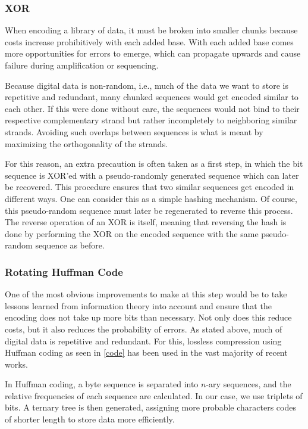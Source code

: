\documentclass[a4paper,conference]{IEEEtran}
\begin{document}
\subsubsection{XOR}
When encoding a library of data, it must be broken into smaller chunks because costs increase prohibitively with each added base. With each added base comes more opportunities for errors to emerge, which can propagate upwards and cause failure during amplification or sequencing.

Because digital data is non-random, i.e., much of the data we want to store is repetitive and redundant, many chunked sequences would get encoded similar to each other. If this were done without care, the sequences would not bind to their respective complementary strand but rather incompletely to neighboring similar strands. Avoiding such overlaps between sequences is what is meant by maximizing the orthogonality of the strands.

For this reason, an extra precaution is often taken as a first step, in which the bit sequence is XOR'ed with a pseudo-randomly generated sequence which can later be recovered. This procedure ensures that two similar sequences get encoded in different ways. One can consider this as a simple hashing mechanism. Of course, this pseudo-random sequence must later be regenerated to reverse this process. The reverse operation of an XOR is itself, meaning that reversing the hash is done by performing the XOR on the encoded sequence with the same pseudo-random sequence as before.

\subsubsection{Rotating Huffman Code}
One of the most obvious improvements to make at this step would be to take lessons learned from information theory into account and ensure that the encoding does not take up more bits than necessary. Not only does this reduce costs, but it also reduces the probability of errors. As stated above, much of digital data is repetitive and redundant. For this, lossless compression using Huffman coding \cite{huffmancode} as seen in \ref{code} has been used in the vast majority of recent works.

In Huffman coding, a byte sequence is separated into $n$-ary sequences, and the relative frequencies of each sequence are calculated. In our case, we use triplets of bits. A ternary tree is then generated, assigning more probable characters codes of shorter length to store data more efficiently.
\end{document}
